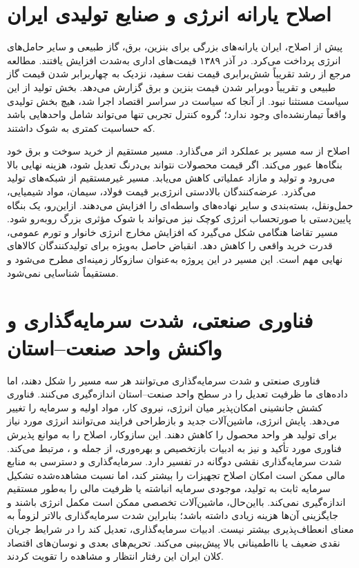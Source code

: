 \documentclass[11pt]{article}
\begin{document}
\section{اصلاح یارانه انرژی و صنایع تولیدی ایران}

پیش از اصلاح، ایران یارانه‌های بزرگی برای بنزین، برق، گاز طبیعی و سایر حامل‌های انرژی پرداخت می‌کرد. در آذر ۱۳۸۹ قیمت‌های اداری به‌شدت افزایش یافتند. مطالعه مرجع از رشد تقریباً شش‌برابری قیمت نفت سفید، نزدیک به چهاربرابر شدن قیمت گاز طبیعی و تقریباً دوبرابر شدن قیمت بنزین و برق گزارش می‌دهد. بخش تولید از این سیاست مستثنا نبود. از آنجا که سیاست در سراسر اقتصاد اجرا شد، هیچ بخش تولیدی واقعاً تیمارنشده‌ای وجود ندارد؛ گروه کنترل تجربی تنها می‌تواند شامل واحدهایی باشد که حساسیت کمتری به شوک داشتند.

اصلاح از سه مسیر بر عملکرد اثر می‌گذارد. مسیر مستقیم از خرید سوخت و برق خود بنگاه‌ها عبور می‌کند. اگر قیمت محصولات نتواند بی‌درنگ تعدیل شود، هزینه نهایی بالا می‌رود و تولید و مازاد عملیاتی کاهش می‌یابد. مسیر غیرمستقیم از شبکه‌های تولید می‌گذرد. عرضه‌کنندگان بالادستی انرژی‌بر قیمت فولاد، سیمان، مواد شیمیایی، حمل‌ونقل، بسته‌بندی و سایر نهاده‌های واسطه‌ای را افزایش می‌دهند. ازاین‌رو، یک بنگاه پایین‌دستی با صورتحساب انرژی کوچک نیز می‌تواند با شوک مؤثری بزرگ روبه‌رو شود. مسیر تقاضا هنگامی شکل می‌گیرد که افزایش مخارج انرژی خانوار و تورم عمومی، قدرت خرید واقعی را کاهش دهد. انقباض حاصل به‌ویژه برای تولیدکنندگان کالاهای نهایی مهم است. این مسیر در این پروژه به‌عنوان سازوکار زمینه‌ای مطرح می‌شود و مستقیماً شناسایی نمی‌شود.

\section{فناوری صنعتی، شدت سرمایه‌گذاری و واکنش واحد صنعت--استان}

فناوری صنعتی و شدت سرمایه‌گذاری می‌توانند هر سه مسیر را شکل دهند، اما داده‌های ما ظرفیت تعدیل را در سطح واحد صنعت--استان اندازه‌گیری می‌کنند. فناوری کشش جانشینی امکان‌پذیر میان انرژی، نیروی کار، مواد اولیه و سرمایه را تغییر می‌دهد. پایش انرژی، ماشین‌آلات جدید و بازطراحی فرایند می‌توانند انرژی مورد نیاز برای تولید هر واحد محصول را کاهش دهند. این سازوکار، اصلاح را به موانع پذیرش فناوری مورد تأکید \citet{parente1994} و نیز به ادبیات بازتخصیص و بهره‌وری، از جمله \citet{olley1996} و \citet{hsieh2009}، مرتبط می‌کند. شدت سرمایه‌گذاری نقشی دوگانه در تفسیر دارد. سرمایه‌گذاری و دسترسی به منابع مالی ممکن است امکان اصلاح تجهیزات را بیشتر کند، اما نسبت مشاهده‌شده تشکیل سرمایه ثابت به تولید، موجودی سرمایه انباشته یا ظرفیت مالی را به‌طور مستقیم اندازه‌گیری نمی‌کند. بااین‌حال، ماشین‌آلات تخصصی ممکن است مکمل انرژی باشند و جایگزینی آن‌ها هزینه زیادی داشته باشد؛ بنابراین شدت سرمایه‌گذاری بالاتر لزوماً به معنای انعطاف‌پذیری بیشتر نیست. ادبیات سرمایه‌گذاری، تعدیل کند را در شرایط جریان نقدی ضعیف یا نااطمینانی بالا پیش‌بینی می‌کند.
تحریم‌های بعدی و نوسان‌های اقتصاد کلان ایران این رفتار انتظار و مشاهده را تقویت کردند.
\end{document}
